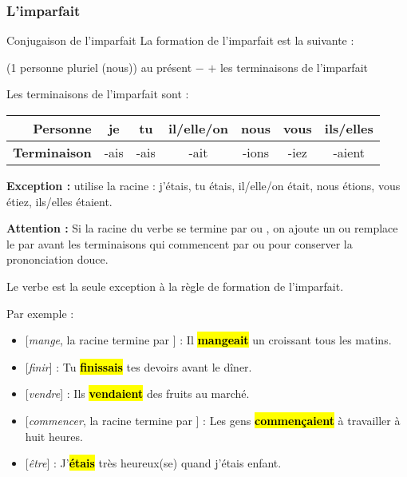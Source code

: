 \subsubsection{L'imparfait}

\begin{frbox}{Conjugaison de l'imparfait}
    La formation de l'imparfait est la suivante :

    {
        \centering
         (1\iere{} personne pluriel (nous)) au présent
        $-$  $+$ les terminaisons de l'imparfait\par
    } 

    Les terminaisons de l'imparfait sont :
    \begin{table}[H]
        \centering
        \begin{tabular}{rcccccc}
            \textbf{Personne} & je & tu & il/elle/on & nous & vous & ils/elles \\
            \hline
            \textbf{Terminaison} & -ais & -ais & -ait & -ions & -iez & -aient
        \end{tabular}
    \end{table}

    \textbf{Exception :}  utilise la racine  :
    j'étais, tu étais, il/elle/on était, nous étions, vous étiez, ils/elles étaient.

    \textbf{Attention :} Si la racine du verbe se termine par  ou ,
    on ajoute un  ou remplace le  par  avant les terminaisons
    qui commencent par  ou  pour conserver la prononciation douce.
\end{frbox}

Le verbe  est la seule exception à la règle de formation de l'imparfait.

Par exemple :
\begin{itemize}
    \item{} [\textit{mange}, la racine termine par ] : Il \hl{\textbf{mang{\color{red}e}ait}} un croissant tous les matins.
    \item{} [\textit{finir}] : Tu \hl{\textbf{finissais}} tes devoirs avant le dîner.
    \item{} [\textit{vendre}] : Ils \hl{\textbf{vendaient}} des fruits au marché.
    \item{} [\textit{commencer}, la racine termine par ] : Les gens \hl{\textbf{commen{\color{red}ç}aient}} à travailler à huit heures.
    \item{} [\textit{être}] : J'\hl{\textbf{étais}} très heureux(se) quand j'étais enfant.
\end{itemize}

